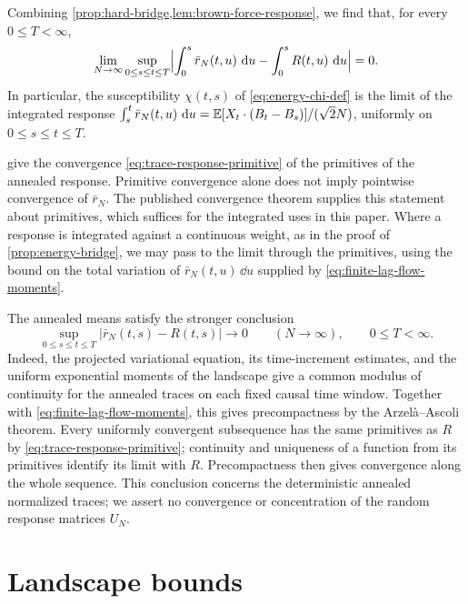 Combining \cref{prop:hard-bridge,lem:brown-force-response}, we find that, for every $0\le T<\infty$,
\begin{equation}\label{eq:trace-response-primitive}
 \lim_{N\to\infty}\sup_{0\le s\le t\le T}\Bigl|\int_0^s\bar r_N(t,u)\,\mathop{}\!\mathrm d u-\int_0^sR(t,u)\,\mathop{}\!\mathrm d u\Bigr|=0.
\end{equation}
In particular, the susceptibility $\chi(t,s)$ of \eqref{eq:energy-chi-def} is the limit of the integrated response $\int_s^t\bar r_N(t,u)\,\mathop{}\!\mathrm d u=\mathbb E[X_t\cdot(B_t-B_s)]/(\sqrt2N)$, uniformly on $0\le s\le t\le T$.

\begin{remark}\label{rem:no-pointwise-response}
 give the convergence \eqref{eq:trace-response-primitive} of the primitives of the annealed response. Primitive convergence alone does not imply pointwise convergence of $\bar r_N$. The published convergence theorem supplies this statement about primitives, which suffices for the integrated uses in this paper. Where a response is integrated against a continuous weight, as in the proof of \cref{prop:energy-bridge}, we may pass to the limit through the primitives, using the bound on the total variation of $\bar r_N(t,u)\,\dd u$ supplied by \eqref{eq:finite-lag-flow-moments}.

The annealed means satisfy the stronger conclusion
\[
 \sup_{0\le s\le t\le T}|\bar r_N(t,s)-R(t,s)|\longrightarrow0
 \qquad(N\to\infty),\qquad 0\le T<\infty.
\]
Indeed, the projected variational equation, its time-increment estimates, and the uniform exponential moments of the landscape give a common modulus of continuity for the annealed traces on each fixed causal time window. Together with \eqref{eq:finite-lag-flow-moments}, this gives precompactness by the Arzel\`a--Ascoli theorem. Every uniformly convergent subsequence has the same primitives as $R$ by \eqref{eq:trace-response-primitive}; continuity and uniqueness of a function from its primitives identify its limit with $R$. Precompactness then gives convergence along the whole sequence. This conclusion concerns the deterministic annealed normalized traces; we assert no convergence or concentration of the random response matrices $U_N$.
\end{remark}

\section{Landscape bounds}\label{sec:landscape}

